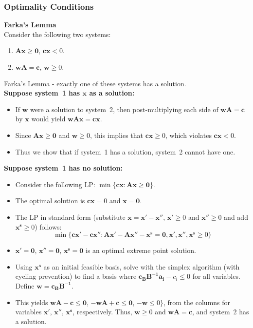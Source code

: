 \subsubsection{Optimality Conditions} 

\vspace{6mm} {\bf Farka's Lemma} \\
Consider the following two systems:
\begin{enumerate}
\item $\mathbf{Ax} \ge \mathbf{0}$, $\mathbf{cx} < 0$.
\item $\mathbf{wA} = \mathbf{c}$, $\mathbf{w} \ge 0$.
\end{enumerate}

Farka's Lemma - exactly one of these systems has a solution. \\


\vspace{3mm} {\bf Suppose system~1 has $\mathbf{x}$ as a solution:}
\begin{itemize}
\item If $\mathbf{w}$ were a solution to system~2, then post-multiplying each side of $\mathbf{wA} = \mathbf{c}$ by $\mathbf{x}$ would yield $\mathbf{wAx} = \mathbf{cx}$.
\item Since $\mathbf{Ax} \ge \mathbf{0}$ and $\mathbf{w} \ge 0$, this implies that $\mathbf{cx} \ge 0$, which violates $\mathbf{cx} < 0$.
\item Thus we show that if system~1 has a solution, system~2 cannot have one.
\end{itemize}

\vspace{3mm} {\bf Suppose system~1 has no solution:}
\begin{itemize}
\item Consider the following LP: $\min\{\mathbf{cx}: \mathbf{Ax} \ge \mathbf{0}$\}.
\item The optimal solution is $\mathbf{cx}=0$ and $\mathbf{x}=\mathbf{0}$.
\item The LP in standard form (substitute $\mathbf{x} = \mathbf{x'}-\mathbf{x''}$,  $\mathbf{x'} \ge 0$ and $\mathbf{x''} \ge 0$ and add $\mathbf{x^s} \ge 0$) follows: \vspace{-3mm}
$$\min\{\mathbf{cx' - cx''}: \mathbf{Ax'-Ax''-x^s} = \mathbf{0}, \mathbf{x'}, \mathbf{x''}, \mathbf{x^s} \ge 0 \}$$ 
\item \vspace{-3mm} $\mathbf{x'}=\mathbf{0}$, $\mathbf{x''}=\mathbf{0}$, $\mathbf{x^s}=\mathbf{0}$ is an optimal extreme point solution.
\item Using $\mathbf{x^s}$ as an initial feasible basis, solve with the simplex algorithm (with cycling prevention) to find a basis where $\mathbf{c_BB^{-1}a_i}-c_i \le 0$ for all variables. Define $\mathbf{w}=\mathbf{c_BB^{-1}}$. 
\item This yields $\mathbf{wA}-\mathbf{c} \le \mathbf{0}$, $-\mathbf{wA}+\mathbf{c} \le \mathbf{0}$, $-\mathbf{w} \le 0 \}$, from the columns for variables  $\mathbf{x'}$, $\mathbf{x''}$, $\mathbf{x^s}$, respectively.  Thus, $\mathbf{w} \ge 0$ and $\mathbf{wA} = \mathbf{c}$, and system~2 has a solution.
\end{itemize}


